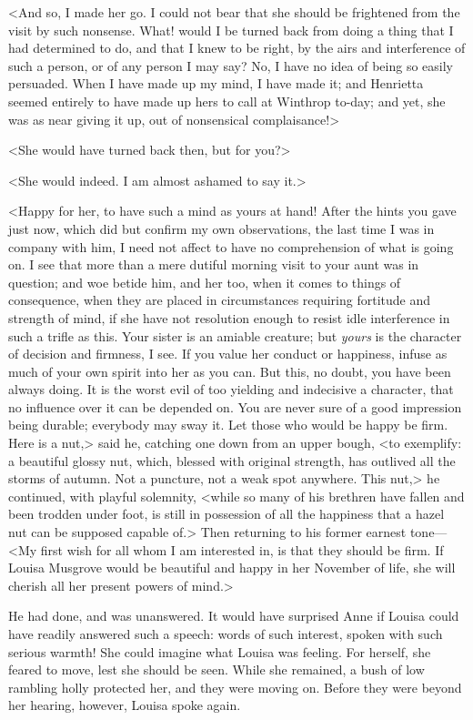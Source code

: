 <And so, I made her go. I could not bear that she should be frightened from the visit by such nonsense. What! would I be turned back from doing a thing that I had determined to do, and that I knew to be right, by the airs and interference of such a person, or of any person I may say? No, I have no idea of being so easily persuaded. When I have made up my mind, I have made it; and Henrietta seemed entirely to have made up hers to call at Winthrop to-day; and yet, she was as near giving it up, out of nonsensical complaisance!>

<She would have turned back then, but for you?>

<She would indeed. I am almost ashamed to say it.>

<Happy for her, to have such a mind as yours at hand! After the hints you gave just now, which did but confirm my own observations, the last time I was in company with him, I need not affect to have no comprehension of what is going on. I see that more than a mere dutiful morning visit to your aunt was in question; and woe betide him, and her too, when it comes to things of consequence, when they are placed in circumstances requiring fortitude and strength of mind, if she have not resolution enough to resist idle interference in such a trifle as this. Your sister is an amiable creature; but \textit{yours} is the character of decision and firmness, I see. If you value her conduct or happiness, infuse as much of your own spirit into her as you can. But this, no doubt, you have been always doing. It is the worst evil of too yielding and indecisive a character, that no influence over it can be depended on. You are never sure of a good impression being durable; everybody may sway it. Let those who would be happy be firm. Here is a nut,> said he, catching one down from an upper bough, <to exemplify: a beautiful glossy nut, which, blessed with original strength, has outlived all the storms of autumn. Not a puncture, not a weak spot anywhere. This nut,> he continued, with playful solemnity, <while so many of his brethren have fallen and been trodden under foot, is still in possession of all the happiness that a hazel nut can be supposed capable of.> Then returning to his former earnest tone—<My first wish for all whom I am interested in, is that they should be firm. If Louisa Musgrove would be beautiful and happy in her November of life, she will cherish all her present powers of mind.>

He had done, and was unanswered. It would have surprised Anne if Louisa could have readily answered such a speech: words of such interest, spoken with such serious warmth! She could imagine what Louisa was feeling. For herself, she feared to move, lest she should be seen. While she remained, a bush of low rambling holly protected her, and they were moving on. Before they were beyond her hearing, however, Louisa spoke again.

